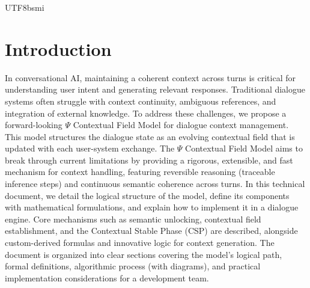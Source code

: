 \documentclass{article}
\begin{document}
\begin{CJK*}{UTF8}{bsmi}
\section{Introduction}
In conversational AI, maintaining a coherent context across turns is critical for understanding user intent and generating relevant responses. Traditional dialogue systems often struggle with context continuity, ambiguous references, and integration of external knowledge. To address these challenges, we propose a forward-looking $\Psi$ Contextual Field Model for dialogue context management. This model structures the dialogue state as an evolving contextual field that is updated with each user-system exchange. The $\Psi$ Contextual Field Model aims to break through current limitations by providing a rigorous, extensible, and fast mechanism for context handling, featuring reversible reasoning (traceable inference steps) and continuous semantic coherence across turns. In this technical document, we detail the logical structure of the model, define its components with mathematical formulations, and explain how to implement it in a dialogue engine. Core mechanisms such as semantic unlocking, contextual field establishment, and the Contextual Stable Phase (CSP) are described, alongside custom-derived formulas and innovative logic for context generation. The document is organized into clear sections covering the model’s logical path, formal definitions, algorithmic process (with diagrams), and practical implementation considerations for a development team.


\end{CJK*}
\end{document}
